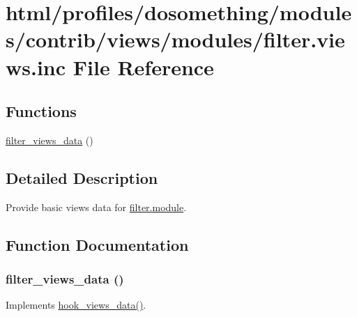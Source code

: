 \hypertarget{filter_8views_8inc}{
\section{html/profiles/dosomething/modules/contrib/views/modules/filter.views.inc File Reference}
\label{filter_8views_8inc}
}
\subsection*{Functions}
\begin{DoxyCompactItemize}
\item 
\hyperlink{filter_8views_8inc_a7cff84d71c43da31b5941bcc92d7bdac}{filter\_\-views\_\-data} ()
\end{DoxyCompactItemize}


\subsection{Detailed Description}
Provide basic views data for \hyperlink{filter_8module}{filter.module}. 

\subsection{Function Documentation}
\hypertarget{filter_8views_8inc_a7cff84d71c43da31b5941bcc92d7bdac}{
\subsubsection[{filter\_\-views\_\-data}]{\setlength{\rightskip}{0pt plus 5cm}filter\_\-views\_\-data ()}}
\label{filter_8views_8inc_a7cff84d71c43da31b5941bcc92d7bdac}
Implements \hyperlink{group__views__hooks_ga227057901681e4a33e33c199c7a8c989}{hook\_\-views\_\-data()}. 